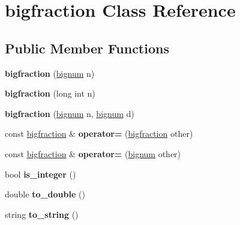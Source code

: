 \hypertarget{classbigfraction}{\section{bigfraction \-Class \-Reference}
\label{classbigfraction}
}
\subsection*{\-Public \-Member \-Functions}
\begin{DoxyCompactItemize}
\item 
\hypertarget{classbigfraction_ad5d4e003b59fe3f6d6d3932c9dd57bdd}{{\bfseries bigfraction} (\hyperlink{classbignum}{bignum} n)}\label{classbigfraction_ad5d4e003b59fe3f6d6d3932c9dd57bdd}

\item 
\hypertarget{classbigfraction_afb6503630eb947945c1f6149f45be044}{{\bfseries bigfraction} (long int n)}\label{classbigfraction_afb6503630eb947945c1f6149f45be044}

\item 
\hypertarget{classbigfraction_a6ac285151bec865f09757eb5f1a514a9}{{\bfseries bigfraction} (\hyperlink{classbignum}{bignum} n, \hyperlink{classbignum}{bignum} d)}\label{classbigfraction_a6ac285151bec865f09757eb5f1a514a9}

\item 
\hypertarget{classbigfraction_a0ed060536058d1172236a0dbef7e6b9e}{const \hyperlink{classbigfraction}{bigfraction} \& {\bfseries operator=} (\hyperlink{classbigfraction}{bigfraction} other)}\label{classbigfraction_a0ed060536058d1172236a0dbef7e6b9e}

\item 
\hypertarget{classbigfraction_ad705145fa5f7a823e9b83d3489d14ea9}{const \hyperlink{classbigfraction}{bigfraction} \& {\bfseries operator=} (\hyperlink{classbignum}{bignum} other)}\label{classbigfraction_ad705145fa5f7a823e9b83d3489d14ea9}

\item 
\hypertarget{classbigfraction_a7adbab48b1e8ad2696c08e43eb9ce875}{bool {\bfseries is\-\_\-integer} ()}\label{classbigfraction_a7adbab48b1e8ad2696c08e43eb9ce875}

\item 
\hypertarget{classbigfraction_a528fcd88713f443d6a24044f03f523fc}{double {\bfseries to\-\_\-double} ()}\label{classbigfraction_a528fcd88713f443d6a24044f03f523fc}

\item 
\hypertarget{classbigfraction_a9cd1fb05823d7316ea2a56f72d7a4f03}{string {\bfseries to\-\_\-string} ()}\label{classbigfraction_a9cd1fb05823d7316ea2a56f72d7a4f03}


\end{DoxyCompactItemize}
